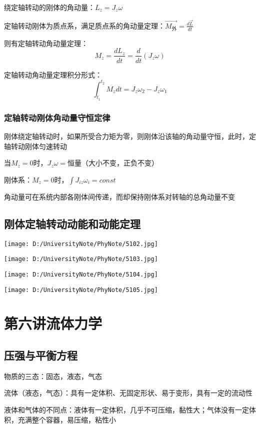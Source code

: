 \documentclass[UTF8]{article}
\begin{document}
    绕定轴转动的刚体的角动量：$L_z = J_z\omega$

    定轴转动刚体为质点系，满足质点系的角动量定理：$\vec{M_{\mbox{外}}} = \frac{d\vec{L}}{dt}$

    则有定轴转动角动量定理：\[M_z = \frac{dL_z}{dt} = \frac{d}{dt}(J_z\omega)\]

    定轴转动角动量定理积分形式：\[\int_{t_1}^{t_2}M_zdt = J_z\omega_2 - J_z\omega_1\]

\subsubsection{定轴转动刚体角动量守恒定律}

    刚体绕定轴转动时，如果所受合力矩为零，则刚体沿该轴的角动量守恒，此时，定轴转动刚体匀速转动

    当$M_z = 0$时，$J_z\omega=$恒量（大小不变，正负不变）

    刚体系：$M_z = 0$时，$\int J_{iz}\omega_i = const$

    角动量可在系统内部各刚体间传递，而却保持刚体系对转轴的总角动量不变

\subsection{刚体定轴转动动能和动能定理}

\texttt{[image: D:/UniversityNote/PhyNote/5102.jpg]}

\texttt{[image: D:/UniversityNote/PhyNote/5103.jpg]}

\texttt{[image: D:/UniversityNote/PhyNote/5104.jpg]}

\texttt{[image: D:/UniversityNote/PhyNote/5105.jpg]}
\newpage
\section{第六讲\;\;流体力学}
\subsection{压强与平衡方程}

    物质的三态：固态，液态，气态

    流体（液态，气态）：具有一定体积、无固定形状、易于变形，具有一定的流动性

    液体和气体的不同点：液体有一定体积，几乎不可压缩，黏性大；气体没有一定体积，充满整个容器，易压缩，粘性小
\end{document}
